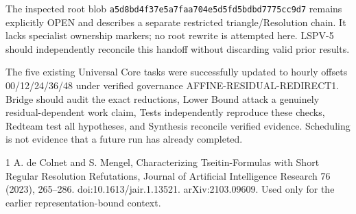 \documentclass[11pt]{article}
\begin{document}
The inspected root blob \texttt{a5d8bd4f37e5a7faa704e5d5fd5bdbd7775cc9d7} remains explicitly OPEN and describes a separate restricted triangle/Resolution chain. It lacks specialist ownership markers; no root rewrite is attempted here. LSPV-5 should independently reconcile this handoff without discarding valid prior results.

The five existing Universal Core tasks were successfully updated to hourly offsets 00/12/24/36/48 under verified governance AFFINE-RESIDUAL-REDIRECT1. Bridge should audit the exact reductions, Lower Bound attack a genuinely residual-dependent work claim, Tests independently reproduce these checks, Redteam test all hypotheses, and Synthesis reconcile verified evidence. Scheduling is not evidence that a future run has already completed.
\begin{thebibliography}{1}
 A. de Colnet and S. Mengel, Characterizing Tseitin-Formulas with Short Regular Resolution Refutations, Journal of Artificial Intelligence Research 76 (2023), 265--286. doi:10.1613/jair.1.13521. arXiv:2103.09609. Used only for the earlier representation-bound context.
\end{thebibliography}
\end{document}
